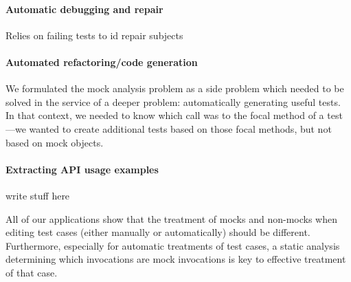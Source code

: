\paragraph{Automatic debugging and repair}
Relies on failing tests to id repair subjects

\paragraph{Automated refactoring/code generation}
We formulated the mock analysis problem as a side problem which needed
to be solved in the service of a deeper problem: automatically
generating useful tests. In that context, we needed to know which call
was to the focal method of a test---we wanted to create additional
tests based on those focal methods, but not based on mock objects.

\paragraph{Extracting API usage examples}
write stuff here

All of our applications show that the treatment of mocks and non-mocks
when editing test cases (either manually or automatically) should be different.
Furthermore, especially for automatic treatments of test cases, a static
analysis determining which invocations are mock invocations is key to effective
treatment of that case.

